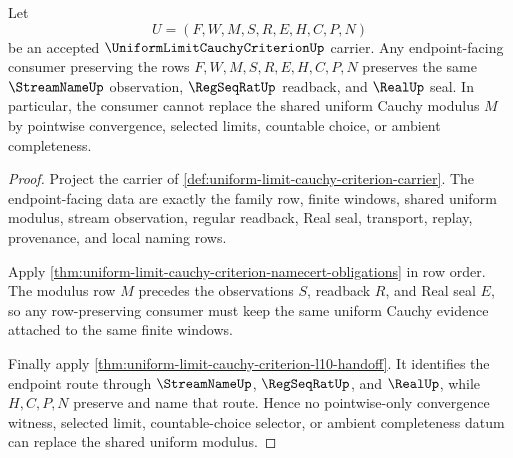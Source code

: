 \begin{theorem}
\label{thm:uniform-limit-cauchy-criterion-endpoint-stability}
Let
$$
U=(F,W,M,S,R,E,H,C,P,N)
$$
be an accepted $\UniformLimitCauchyCriterionUp$ carrier. Any endpoint-facing consumer preserving the rows $F,W,M,S,R,E,H,C,P,N$ preserves the same $\StreamNameUp$ observation, $\RegSeqRatUp$ readback, and $\RealUp$ seal. In particular, the consumer cannot replace the shared uniform Cauchy modulus $M$ by pointwise convergence, selected limits, countable choice, or ambient completeness.
\end{theorem}
\begin{proof}
Project the carrier of \autoref{def:uniform-limit-cauchy-criterion-carrier}. The endpoint-facing data are exactly the family row, finite windows, shared uniform modulus, stream observation, regular readback, Real seal, transport, replay, provenance, and local naming rows.

Apply \autoref{thm:uniform-limit-cauchy-criterion-namecert-obligations} in row order. The modulus row $M$ precedes the observations $S$, readback $R$, and Real seal $E$, so any row-preserving consumer must keep the same uniform Cauchy evidence attached to the same finite windows.

Finally apply \autoref{thm:uniform-limit-cauchy-criterion-l10-handoff}. It identifies the endpoint route through $\StreamNameUp$, $\RegSeqRatUp$, and $\RealUp$, while $H,C,P,N$ preserve and name that route. Hence no pointwise-only convergence witness, selected limit, countable-choice selector, or ambient completeness datum can replace the shared uniform modulus.
\end{proof}


\begin{closurestatus}{\UniformLimitCauchyCriterionUp}
  \theoryclosure{\obligationClosure}
  \formalstatus{\unformalizedV}
\end{closurestatus}
